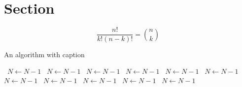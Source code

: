 \documentclass[a4paper]{article}
\begin{document}
\section{Section}

\[ \frac{n!}{k!(n-k)!} = \binom{n}{k} \]

\begin{algorithm}
\caption{An algorithm with caption}
\begin{algorithmic}
\    \State $N \gets N - 1$
\    \State $N \gets N - 1$
\    \State $N \gets N - 1$
\    \State $N \gets N - 1$
\    \State $N \gets N - 1$
\    \State $N \gets N - 1$
\    \State $N \gets N - 1$
\    \State $N \gets N - 1$
\    \State $N \gets N - 1$
\    \State $N \gets N - 1$
\    \State $N \gets N - 1$
\EndWhile
\end{algorithmic}
\end{algorithm}
\end{document}
